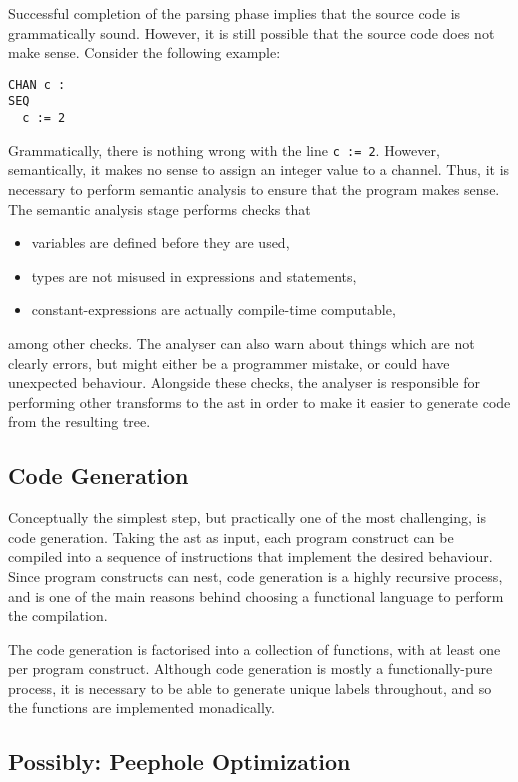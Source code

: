 Successful completion of the parsing phase implies that the source code is
grammatically sound. However, it is still possible that the source code does not
make sense. Consider the following example:
\begin{lstlisting}[language=occam]
CHAN c :
SEQ
  c := 2
\end{lstlisting}
Grammatically, there is nothing wrong with the line \texttt{c := 2}. However,
semantically, it makes no sense to assign an integer value to a channel. Thus,
it is necessary to perform semantic analysis to ensure that the program makes
sense. The semantic analysis stage performs checks that
\begin{itemize}
  \item variables are defined before they are used,
  \item types are not misused in expressions and statements,
  \item constant-expressions are actually compile-time computable,
\end{itemize}
among other checks. The analyser can also warn about things which are not
clearly errors, but might either be a programmer mistake, or could have
unexpected behaviour. Alongside these checks, the analyser is responsible for
performing other transforms to the \gls{ast} in order to make it easier to
generate code from the resulting tree.

\subsection{Code Generation}

Conceptually the simplest step, but practically one of the most challenging,
is code generation. Taking the \gls{ast} as input, each program construct can be
compiled into a sequence of instructions that implement the desired behaviour.
Since program constructs can nest, code generation is a highly recursive
process, and is one of the main reasons behind choosing a functional language to
perform the compilation.

The code generation is factorised into a collection of functions, with at least
one per program construct. Although code generation is mostly a
functionally-pure process, it is necessary to be able to generate unique labels
throughout, and so the functions are implemented monadically.

\subsection{Possibly: Peephole Optimization}

